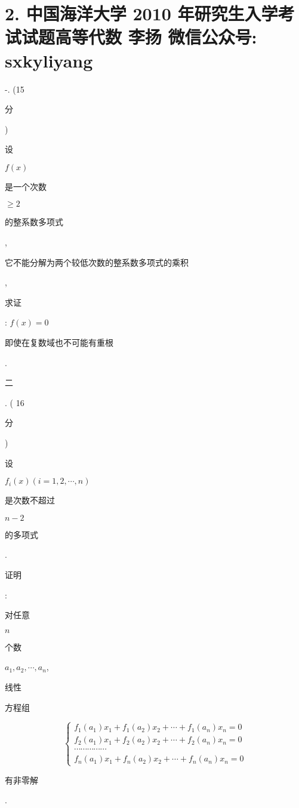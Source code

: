 \documentclass[10pt]{article}
\begin{document}
\section{2. 中国海洋大学 2010 年研究生入学考试试题高等代数 
 李扬 
 微信公众号: sxkyliyang}
-. (15 \begin{CJK}{UTF8}{mj}分\end{CJK}) \begin{CJK}{UTF8}{mj}设\end{CJK} $f(x)$ \begin{CJK}{UTF8}{mj}是一个次数\end{CJK} $\geqslant 2$ \begin{CJK}{UTF8}{mj}的整系数多项式\end{CJK}, \begin{CJK}{UTF8}{mj}它不能分解为两个较低次数的整系数多项式的乘积\end{CJK}, \begin{CJK}{UTF8}{mj}求证\end{CJK}: $f(x)=0$ \begin{CJK}{UTF8}{mj}即使在复数域也不可能有重根\end{CJK}.

\begin{CJK}{UTF8}{mj}二\end{CJK}. ( 16 \begin{CJK}{UTF8}{mj}分\end{CJK}) \begin{CJK}{UTF8}{mj}设\end{CJK} $f_{i}(x)(i=1,2, \cdots, n)$ \begin{CJK}{UTF8}{mj}是次数不超过\end{CJK} $n-2$ \begin{CJK}{UTF8}{mj}的多项式\end{CJK}. \begin{CJK}{UTF8}{mj}证明\end{CJK}: \begin{CJK}{UTF8}{mj}对任意\end{CJK} $n$ \begin{CJK}{UTF8}{mj}个数\end{CJK} $a_{1}, a_{2}, \cdots, a_{n}$, \begin{CJK}{UTF8}{mj}线性\end{CJK} \begin{CJK}{UTF8}{mj}方程组\end{CJK}
$$
\left\{\begin{array}{c}
f_{1}\left(a_{1}\right) x_{1}+f_{1}\left(a_{2}\right) x_{2}+\cdots+f_{1}\left(a_{n}\right) x_{n}=0 \\
f_{2}\left(a_{1}\right) x_{1}+f_{2}\left(a_{2}\right) x_{2}+\cdots+f_{2}\left(a_{n}\right) x_{n}=0 \\
\cdots \cdots \cdots \cdots \cdots \\
f_{n}\left(a_{1}\right) x_{1}+f_{n}\left(a_{2}\right) x_{2}+\cdots+f_{n}\left(a_{n}\right) x_{n}=0
\end{array}\right.
$$
\begin{CJK}{UTF8}{mj}有非零解\end{CJK}.
\end{document}
